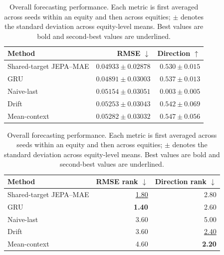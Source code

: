 \begin{table}[t]
\centering
\small
\caption{Overall forecasting performance. Each metric is first averaged across seeds within an equity and then across equities; $\pm$ denotes the standard deviation across equity-level means. Best values are bold and second-best values are underlined.}
\label{tab:main_metrics}
\begin{tabular}{lrr}
\toprule
Method & RMSE $\downarrow$ & Direction $\uparrow$ \\
\midrule
Shared-target JEPA--MAE & \underline{$0.04933 \pm 0.02878$} & $0.530 \pm 0.015$ \\
GRU & \textbf{$0.04891 \pm 0.03003$} & $0.537 \pm 0.013$ \\
Naive-last & $0.05154 \pm 0.03051$ & $0.003 \pm 0.005$ \\
Drift & $0.05253 \pm 0.03043$ & \underline{$0.542 \pm 0.069$} \\
Mean-context & $0.05282 \pm 0.03032$ & \textbf{$0.547 \pm 0.056$} \\
\bottomrule
\end{tabular}
\par\medskip
\begin{tabular}{lrr}
\toprule
Method & RMSE rank $\downarrow$ & Direction rank $\downarrow$ \\
\midrule
Shared-target JEPA--MAE & \underline{1.80} & 2.80 \\
GRU & \textbf{1.40} & 2.60 \\
Naive-last & 3.60 & 5.00 \\
Drift & 3.60 & \underline{2.40} \\
Mean-context & 4.60 & \textbf{2.20} \\
\bottomrule
\end{tabular}
\end{table}

